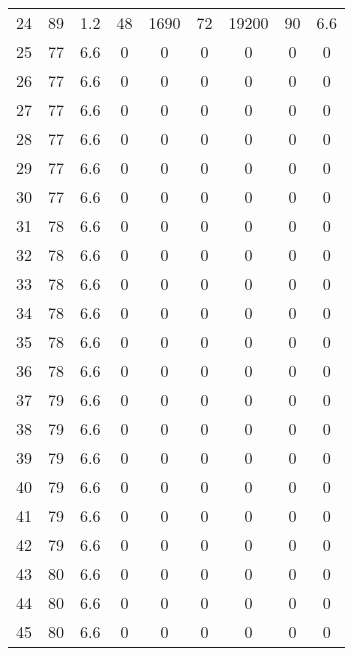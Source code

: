 \begin{center}
\begin{footnotesize}
\begin{tabular}{|c|cccccccc|}
24 & 89 & 1.2 & 48 & 1690 & 72 & 19200 & 90 & 6.6 \\
25 & 77 & 6.6 & 0 & 0 & 0 & 0 & 0 & 0 \\
26 & 77 & 6.6 & 0 & 0 & 0 & 0 & 0 & 0 \\
27 & 77 & 6.6 & 0 & 0 & 0 & 0 & 0 & 0 \\
28 & 77 & 6.6 & 0 & 0 & 0 & 0 & 0 & 0 \\
29 & 77 & 6.6 & 0 & 0 & 0 & 0 & 0 & 0 \\
30 & 77 & 6.6 & 0 & 0 & 0 & 0 & 0 & 0 \\
31 & 78 & 6.6 & 0 & 0 & 0 & 0 & 0 & 0 \\
32 & 78 & 6.6 & 0 & 0 & 0 & 0 & 0 & 0 \\
33 & 78 & 6.6 & 0 & 0 & 0 & 0 & 0 & 0 \\
34 & 78 & 6.6 & 0 & 0 & 0 & 0 & 0 & 0 \\
35 & 78 & 6.6 & 0 & 0 & 0 & 0 & 0 & 0 \\
36 & 78 & 6.6 & 0 & 0 & 0 & 0 & 0 & 0 \\
37 & 79 & 6.6 & 0 & 0 & 0 & 0 & 0 & 0 \\
38 & 79 & 6.6 & 0 & 0 & 0 & 0 & 0 & 0 \\
39 & 79 & 6.6 & 0 & 0 & 0 & 0 & 0 & 0 \\
40 & 79 & 6.6 & 0 & 0 & 0 & 0 & 0 & 0 \\
41 & 79 & 6.6 & 0 & 0 & 0 & 0 & 0 & 0 \\
42 & 79 & 6.6 & 0 & 0 & 0 & 0 & 0 & 0 \\
43 & 80 & 6.6 & 0 & 0 & 0 & 0 & 0 & 0 \\
44 & 80 & 6.6 & 0 & 0 & 0 & 0 & 0 & 0 \\
45 & 80 & 6.6 & 0 & 0 & 0 & 0 & 0 & 0 \\
\hline
\end{tabular}
\end{footnotesize}
\end{center}

